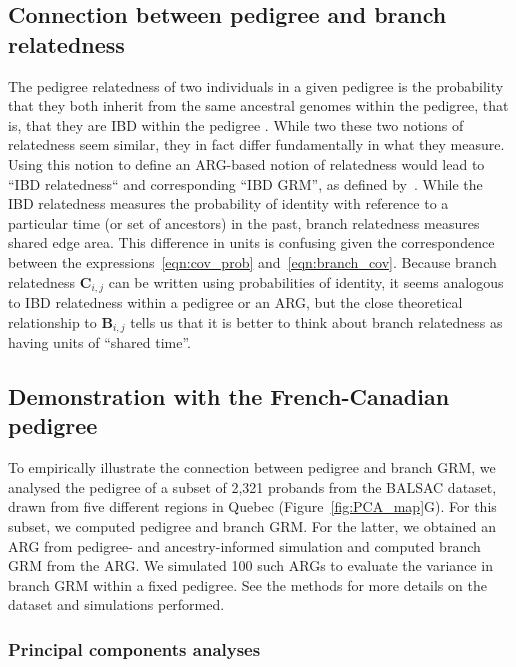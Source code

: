 \subsection{Connection between pedigree and branch relatedness}
The pedigree relatedness of two individuals in a given pedigree is
the probability that they both inherit from the same ancestral genomes within the pedigree,
that is, that they are IBD within the pedigree \citep{malecot1969mathemathics}.
While two these two notions of relatedness seem similar,
they in fact differ fundamentally in what they measure.
%
Using this notion to define an ARG-based notion of relatedness would lead to ``IBD relatedness``
and corresponding ``IBD GRM'',
as defined by~\citet{tsambos2022efficient}.
%
While the IBD relatedness measures the
probability of identity with reference to a particular time (or set of ancestors) in the past,
branch relatedness measures shared edge area.
%
This difference in units is confusing given the correspondence between
the expressions~\eqref{eqn:cov_prob} and~\eqref{eqn:branch_cov}.
%
Because branch relatedness $\mathbf{C}_{i,j}$ can be written using probabilities of identity,
it seems analogous to IBD relatedness within a pedigree or an ARG,
but the close theoretical relationship to $\mathbf{B}_{i,j}$
tells us that it is better to think about branch relatedness as having units of ``shared time''.


\subsection{Demonstration with the French-Canadian pedigree}

To empirically illustrate the connection between pedigree and branch GRM,
we analysed the pedigree of a subset of 2,321 probands from the BALSAC dataset,
drawn from five different regions in Quebec (Figure~\ref{fig:PCA_map}G).
%
For this subset, we computed pedigree and branch GRM.
%
For the latter, we obtained an ARG from pedigree- and ancestry-informed simulation
and computed branch GRM from the ARG.
%
We simulated 100 such ARGs to evaluate the variance in branch GRM within a fixed pedigree.
See the methods for more details on the dataset and simulations performed.

\subsubsection{Principal components analyses}

